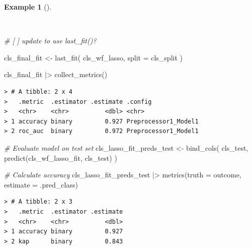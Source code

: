 \documentclass[
  letterpaper,
  DIV=11,
  numbers=noendperiod]{scrreprt}
\newenvironment{Shaded}{\begin{snugshade}}{\end{snugshade}}
\newcommand{\AttributeTok}[1]{\textcolor[rgb]{0.00,0.00,0.00}{#1}}
\newcommand{\CommentTok}[1]{\textcolor[rgb]{0.00,0.00,0.00}{\textit{#1}}}
\newcommand{\FunctionTok}[1]{\textcolor[rgb]{0.00,0.00,0.00}{#1}}
\newcommand{\NormalTok}[1]{\textcolor[rgb]{0.00,0.00,0.00}{#1}}
\newcommand{\OtherTok}[1]{\textcolor[rgb]{0.00,0.00,0.00}{#1}}
\newcommand{\SpecialCharTok}[1]{\textcolor[rgb]{0.00,0.00,0.00}{#1}}
\theoremstyle{definition}
\newtheorem{example}{Example}[chapter]
\theoremstyle{remark}
\begin{document}
\begin{example}[]\protect\hypertarget{exm-pda-class-tune-hyperparameters-evaluate-test}{}\label{exm-pda-class-tune-hyperparameters-evaluate-test}

~

\begin{Shaded}
\begin{Highlighting}[]
\CommentTok{\# [ ] update to use \textasciigrave{}last\_fit()\textasciigrave{}?}

\NormalTok{cls\_final\_fit }\OtherTok{\textless{}{-}}
  \FunctionTok{last\_fit}\NormalTok{(}
\NormalTok{    cls\_wf\_lasso,}
    \AttributeTok{split =}\NormalTok{ cls\_split}
\NormalTok{  )}

\NormalTok{cls\_final\_fit }\SpecialCharTok{|\textgreater{}}
  \FunctionTok{collect\_metrics}\NormalTok{()}
\end{Highlighting}
\end{Shaded}

\begin{verbatim}
> # A tibble: 2 x 4
>   .metric  .estimator .estimate .config             
>   <chr>    <chr>          <dbl> <chr>               
> 1 accuracy binary         0.927 Preprocessor1_Model1
> 2 roc_auc  binary         0.972 Preprocessor1_Model1
\end{verbatim}

\begin{Shaded}
\begin{Highlighting}[]
\CommentTok{\# Evaluate model on test set}
\NormalTok{cls\_lasso\_fit\_preds\_test }\OtherTok{\textless{}{-}}
  \FunctionTok{bind\_cols}\NormalTok{(}
\NormalTok{    cls\_test,}
    \FunctionTok{predict}\NormalTok{(cls\_wf\_lasso\_fit, cls\_test)}
\NormalTok{  )}

\CommentTok{\# Calculate accuracy}
\NormalTok{cls\_lasso\_fit\_preds\_test }\SpecialCharTok{|\textgreater{}}
  \FunctionTok{metrics}\NormalTok{(}\AttributeTok{truth =}\NormalTok{ outcome, }\AttributeTok{estimate =}\NormalTok{ .pred\_class)}
\end{Highlighting}
\end{Shaded}

\begin{verbatim}
> # A tibble: 2 x 3
>   .metric  .estimator .estimate
>   <chr>    <chr>          <dbl>
> 1 accuracy binary         0.927
> 2 kap      binary         0.843
\end{verbatim}

\end{example}
\end{document}
